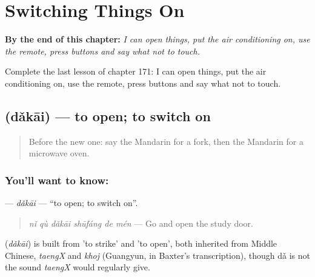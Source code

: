 
\chapter{Switching Things On}
\label{ch:zh-switching-things-on}

\begin{chapteropening}
\textbf{By the end of this chapter:} \emph{I can open things, put the air conditioning on, use the remote, press buttons and say what not to touch.}

Complete the last lesson of chapter 171: I can open things, put the air conditioning on, use the remote, press buttons and say what not to touch.
\end{chapteropening}

\section[\texorpdfstring{\zh{打开} (dǎkāi)}{打开 (dǎkāi)}]{ (dǎkāi) — to open; to switch on}

\label{lesson:ZH-C171-dakai}



\begin{quote}
Before the new one: say the Mandarin for a fork, then the Mandarin for a microwave oven.
\end{quote}

\subsection*{You'll want to know: }
\textbf{} — \emph{dǎkāi} — \textquotedblleft{}to open; to switch on\textquotedblright{}.

\begin{quote}
\textbf{} \emph{nǐ qù dǎkāi shūfáng de mén} — Go and open the study door.
\end{quote}

\begin{cousinweb}
\textbf{} (\emph{dǎkāi}) is built from  'to strike' and  'to open', both inherited from Middle Chinese, \emph{taengX} and \emph{khoj} (Guangyun, in Baxter's transcription), though dǎ is not the sound \emph{taengX} would regularly give.
\end{cousinweb}


